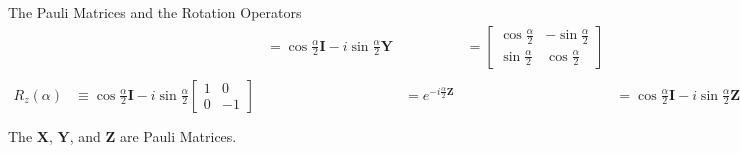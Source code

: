 \documentclass{beamer}
\begin{document}
\begin{frame}{The Pauli Matrices and the Rotation Operators\tiny\cite{rotationsonblochsphere}}
{\begin{align*}
                  &&= \cos\frac{\alpha}2\mathbf{I} - i\sin\frac{\alpha}2 \mathbf{Y}
                  &&=\begin{bmatrix}
                    \cos\frac{\alpha}2 & -\sin\frac{\alpha}2 \\
                    \sin\frac{\alpha}2 & \cos\frac{\alpha}2
                    \end{bmatrix} \\
      R_z(\alpha) &\equiv \cos\frac{\alpha}2\mathbf{I} - i\sin\frac{\alpha}2
                                                                     \begin{bmatrix}
                                                                       1 & 0 \\
                                                                       0 & -1 
                                                                     \end{bmatrix}
                  &&= e^{-i\frac{\alpha}2\mathbf{Z}}
                  &&= \cos\frac{\alpha}2\mathbf{I} - i\sin\frac{\alpha}2 \mathbf{Z}
                  &&=\begin{bmatrix}
                    e^{-i\frac{\alpha}2} & 0 \\
                    0 & e^{i\frac{\alpha}2}
                    \end{bmatrix} \\
    \end{align*}
    The $\mathbf{X}$, $\mathbf{Y}$, and $\mathbf{Z}$ are Pauli Matrices.
  }%
\end{frame}
\end{document}
